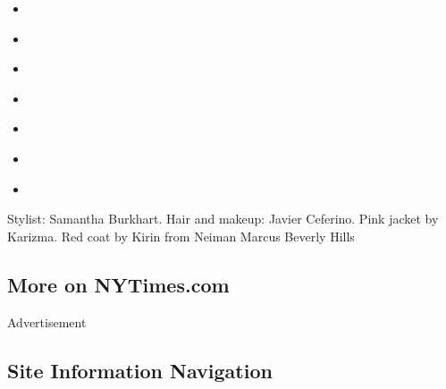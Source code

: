 \begin{itemize}
\tightlist
\item
  \href{https://www.nytimes3xbfgragh.onion/interactive/2019/10/09/magazine/tyler-perry-black-theater.html}{}
\item
  \href{https://www.nytimes3xbfgragh.onion/interactive/2019/10/09/magazine/PewDiePie-interview.html}{}
\item
  \href{https://www.nytimes3xbfgragh.onion/interactive/2019/10/09/magazine/kathryn-hahn-mrs-fletcher.html}{}
\item
  \href{https://www.nytimes3xbfgragh.onion/interactive/2019/10/08/magazine/black-women-artists-conversation.html}{}
\item
  \href{https://www.nytimes3xbfgragh.onion/interactive/2019/10/08/magazine/ben-lerner-topeka-school.html}{}
\item
  \href{https://www.nytimes3xbfgragh.onion/interactive/2019/10/08/magazine/susan-sontag.html}{}
\item
  \href{https://www.nytimes3xbfgragh.onion/interactive/2019/10/09/magazine/moma-reopening.html}{}
\end{itemize}

Stylist: Samantha Burkhart. Hair and makeup: Javier Ceferino. Pink
jacket by Karizma. Red coat by Kirin from Neiman Marcus Beverly Hills

\hypertarget{more-on-nytimescom}{%
\subsection{More on NYTimes.com}\label{more-on-nytimescom}}

Advertisement

\hypertarget{site-information-navigation}{%
\subsection{Site Information
Navigation}\label{site-information-navigation}}

